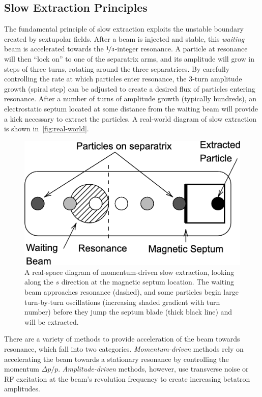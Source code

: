 \documentclass[a4paper,twoside,11pt]{report}
\begin{document}
\subsection{Slow Extraction Principles}
The fundamental principle of slow extraction exploits the unstable boundary created by sextupolar fields. After a beam is injected and stable, this \textit{waiting} beam is accelerated towards the $\nicefrac 13$-integer resonance. A particle at resonance will then ``lock on'' to one of the separatrix arms, and its amplitude will grow in steps of three turns, rotating around the three separatrices. By carefully controlling the rate at which particles enter resonance, the 3-turn amplitude growth (spiral step) can be adjusted to create a desired flux of particles entering resonance. After a number of turns of amplitude growth (typically hundreds), an electrostatic septum located at some distance from the waiting beam will provide a kick necessary to extract the particles. A real-world diagram of slow extraction is shown in~\autoref{fig:real-world}.

\begin{figure}
  \centering
  \includegraphics[width=0.6\linewidth]{real-world.png}
  \caption[Real-space diagram of momentum-driven slow extraction]{A real-space diagram of momentum-driven slow extraction, looking along the $s$ direction at the magnetic septum location. The waiting beam approaches resonance (dashed), and some particles begin large turn-by-turn oscillations (increasing shaded gradient with turn number) before they jump the septum blade (thick black line) and will be extracted.}\label{fig:real-world}
\end{figure}

There are a variety of methods to provide acceleration of the beam towards resonance, which fall into two categories. \textit{Momentum-driven} methods rely on accelerating the beam towards a stationary resonance by controlling the momentum $\Delta p/p$. \textit{Amplitude-driven} methods, however, use transverse noise or RF excitation at the beam's revolution frequency to create increasing betatron amplitudes. 
\end{document}
